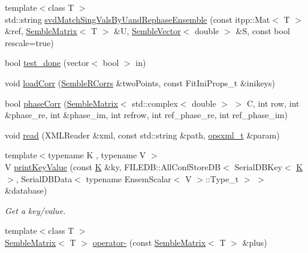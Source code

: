 \begin{DoxyCompactItemize}
\item 
{\footnotesize template$<$class T $>$ }\\std\+::string \mbox{\hyperlink{namespaceSEMBLE_a61ca40cf973c57e2fb720ed03c22fcd6}{svd\+Match\+Sing\+Vals\+By\+Uand\+Rephase\+Ensemble}} (const itpp\+::\+Mat$<$ T $>$ \&ref, \mbox{\hyperlink{structSEMBLE_1_1SembleMatrix}{Semble\+Matrix}}$<$ T $>$ \&U, \mbox{\hyperlink{structSEMBLE_1_1SembleVector}{Semble\+Vector}}$<$ double $>$ \&S, const bool rescale=true)
\item 
bool \mbox{\hyperlink{namespaceSEMBLE_a999819c800079746167b4fb0d71b44a8}{test\+\_\+done}} (vector$<$ bool $>$ in)
\item 
void \mbox{\hyperlink{namespaceSEMBLE_ac1cc350e27e1e8e132f8b9af4145950f}{load\+Corr}} (\mbox{\hyperlink{classSEMBLE_1_1SembleRCorrs}{Semble\+R\+Corrs}} \&two\+Points, const Fit\+Ini\+Props\+\_\+t \&inikeys)
\item 
bool \mbox{\hyperlink{namespaceSEMBLE_aba48c04efaaf56c5a4400350190a4828}{phase\+Corr}} (\mbox{\hyperlink{structSEMBLE_1_1SembleMatrix}{Semble\+Matrix}}$<$ std\+::complex$<$ double $>$ $>$ C, int row, int \&phase\+\_\+re, int \&phase\+\_\+im, int refrow, int ref\+\_\+phase\+\_\+re, int ref\+\_\+phase\+\_\+im)
\item 
void \mbox{\hyperlink{namespaceSEMBLE_ab4728ebf9760db0c2af2c3c44d099e05}{read}} (X\+M\+L\+Reader \&xml, const std\+::string \&path, \mbox{\hyperlink{structSEMBLE_1_1opsxml__t}{opsxml\+\_\+t}} \&param)
\item 
{\footnotesize template$<$typename K , typename V $>$ }\\V \mbox{\hyperlink{namespaceSEMBLE_ab37ccf132600d41472bb11c6ff531166}{print\+Key\+Value}} (const \mbox{\hyperlink{test__db_8cc_ab54a55a9054a3f0247c74233453ae568}{K}} \&ky, F\+I\+L\+E\+D\+B\+::\+All\+Conf\+Store\+DB$<$ Serial\+D\+B\+Key$<$ \mbox{\hyperlink{test__db_8cc_ab54a55a9054a3f0247c74233453ae568}{K}} $>$, Serial\+D\+B\+Data$<$ typename Ensem\+Scalar$<$ V $>$\+::Type\+\_\+t $>$ $>$ \&database)
\begin{DoxyCompactList}\small\item\em Get a key/value. \end{DoxyCompactList}\item 
{\footnotesize template$<$class T $>$ }\\\mbox{\hyperlink{structSEMBLE_1_1SembleMatrix}{Semble\+Matrix}}$<$ T $>$ \mbox{\hyperlink{namespaceSEMBLE_a16e3604600dcf914788dc4f0d92a2fe7}{operator-\/}} (const \mbox{\hyperlink{structSEMBLE_1_1SembleMatrix}{Semble\+Matrix}}$<$ T $>$ \&plus)

\end{DoxyCompactItemize}

